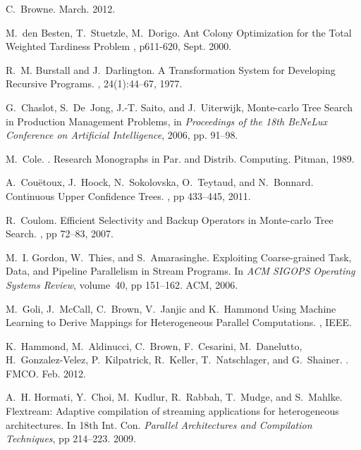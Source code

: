 \documentclass[smallextended]{svjour3}
\begin{document}
\begin{thebibliography}{}
C.~Browne.
 March. 2012.

M.~den Besten, T.~Stuetzle, M.~Dorigo.
\newblock Ant Colony Optimization for the Total Weighted Tardiness
Problem
, p611-620, Sept. 2000.

R.~M. Burstall and J.~Darlington.
\newblock A {T}ransformation {S}ystem for {D}eveloping {R}ecursive {P}rograms.
, 24(1):44--67, 1977.

G.~Chaslot, S.~De~Jong, J.-T. Saito, and J.~Uiterwijk, Monte-carlo Tree
 Search in Production Management Problems, in \emph{Proceedings of the 18th
 BeNeLux Conference on Artificial Intelligence}, 2006, pp. 91--98.
 
M.~Cole.
.
\newblock Research Monographs in Par. and Distrib. Computing. Pitman, 1989.
 
A.~Cou{\"e}toux, J.~Hoock, N.~Sokolovska, O.~Teytaud, and N.~Bonnard.
\newblock Continuous Upper Confidence Trees.
, pp 433--445, 2011.

R.~Coulom.
\newblock Efficient Selectivity and Backup Operators in Monte-carlo Tree
  Search.
, pp 72--83, 2007.

M.~I. Gordon, W.~Thies, and S.~Amarasinghe.
\newblock Exploiting Coarse-grained Task, Data, and Pipeline Parallelism in
  Stream Programs.
\newblock In {\em ACM SIGOPS Operating Systems Review}, volume~40, pp
  151--162. ACM, 2006.

M.~Goli, J.~McCall, C.~Brown, V.~Janjic and K.~Hammond
\newblock Using Machine Learning to Derive Mappings for Heterogeneous Parallel Computations.
, IEEE.

K.~Hammond, M.~Aldinucci, C.~Brown, F.~Cesarini, M.~Danelutto,
  H.~Gonzalez-Velez, P.~Kilpatrick, R.~Keller, T.~Natschlager, and G.~Shainer.
.
\newblock FMCO. Feb. 2012.

A.~H. Hormati, Y.~Choi, M.~Kudlur, R.~Rabbah, T.~Mudge, and S.~Mahlke.
\newblock Flextream: Adaptive compilation of streaming applications for
  heterogeneous architectures.
\newblock In {18th Int. Con. \em Parallel Architectures and Compilation Techniques}, pp 214--223. 2009.


\end{thebibliography}
\end{document}
